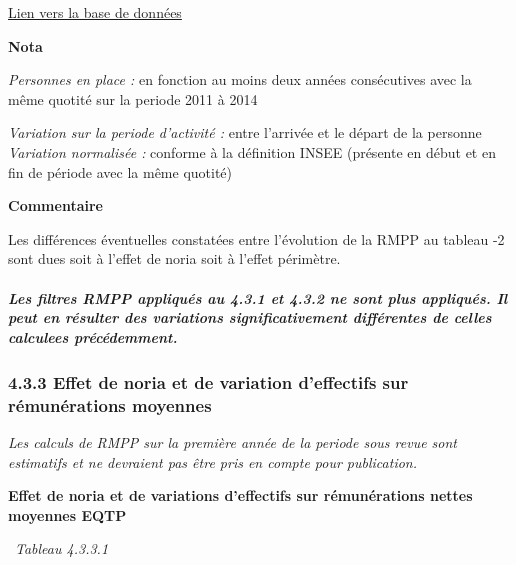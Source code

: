 \href{../Bases/Remunerations/Anavar.synthese.csv}{Lien vers la base de
données}

\textbf{Nota}

\emph{Personnes en place :} en fonction au moins deux années
consécutives avec la même quotité sur la periode 2011 à 2014

\emph{Variation sur la periode d'activité :} entre l'arrivée et le
départ de la personne\\
\emph{Variation normalisée :} conforme à la définition INSEE (présente
en début et en fin de période avec la même quotité)

\textbf{Commentaire}

Les différences éventuelles constatées entre l'évolution de la RMPP au
tableau -2 sont dues soit à l'effet de noria soit à l'effet périmètre.

\hypertarget{les-filtres-rmpp-appliques-au-4.3.1-et-4.3.2-ne-sont-plus-appliques.-il-peut-en-resulter-des-variations-significativement-differentes-de-celles-calculees-precedemment.}{%
\subparagraph{Les filtres RMPP appliqués au 4.3.1 et 4.3.2 ne sont plus
appliqués. Il peut en résulter des variations significativement
différentes de celles calculees
précédemment.}\label{les-filtres-rmpp-appliques-au-4.3.1-et-4.3.2-ne-sont-plus-appliques.-il-peut-en-resulter-des-variations-significativement-differentes-de-celles-calculees-precedemment.}}

\hypertarget{effet-de-noria-et-de-variation-deffectifs-sur-remunerations-moyennes}{%
\subsubsection{4.3.3 Effet de noria et de variation d'effectifs sur
rémunérations
moyennes}\label{effet-de-noria-et-de-variation-deffectifs-sur-remunerations-moyennes}}

\emph{Les calculs de RMPP sur la première année de la periode sous revue
sont estimatifs et ne devraient pas être pris en compte pour
publication.}

\textbf{Effet de noria et de variations d'effectifs sur rémunérations
nettes moyennes EQTP}

~\emph{Tableau 4.3.3.1}


